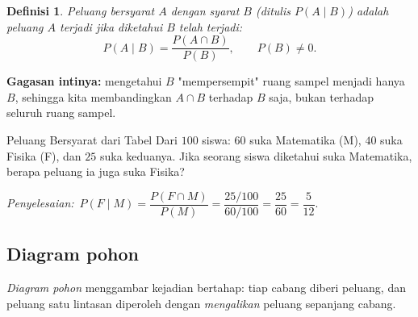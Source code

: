 \documentclass[11pt,a4paper]{report}
\theoremstyle{gaya}
\newtheorem{definisi}{Definisi}[chapter]
\newcommand{\jawab}{\par\smallskip\noindent\textit{\textcolor{oranye}{Penyelesaian:}}\ }
\begin{document}
\begin{definisi}
\emph{Peluang bersyarat} $A$ dengan syarat $B$ (ditulis $P(A\mid B)$) adalah peluang $A$ terjadi jika diketahui $B$ telah terjadi:
\[
P(A\mid B)=\frac{P(A\cap B)}{P(B)},\qquad P(B)\neq0.
\]
\end{definisi}

\textbf{Gagasan intinya:} mengetahui $B$ "mempersempit" ruang sampel menjadi hanya $B$, sehingga kita membandingkan $A\cap B$ terhadap $B$ saja, bukan terhadap seluruh ruang sampel.

\begin{contoh}{Peluang Bersyarat dari Tabel}
Dari $100$ siswa: $60$ suka Matematika (M), $40$ suka Fisika (F), dan $25$ suka keduanya. Jika seorang siswa diketahui suka Matematika, berapa peluang ia juga suka Fisika?

\jawab $P(F\mid M)=\dfrac{P(F\cap M)}{P(M)}=\dfrac{25/100}{60/100}=\dfrac{25}{60}=\dfrac{5}{12}.$
\end{contoh}

\subsection*{Diagram pohon}
\emph{Diagram pohon} menggambar kejadian bertahap: tiap cabang diberi peluang, dan peluang satu lintasan diperoleh dengan \emph{mengalikan} peluang sepanjang cabang.
\end{document}
